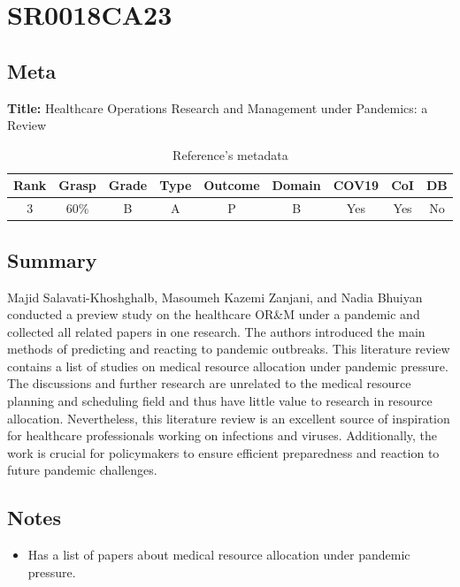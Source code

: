 \section{ SR0018CA23 }


\subsection{Meta}

    \textbf{Title:}
    Healthcare Operations Research and Management under Pandemics: a Review

    \begin{table}[H]
        \centering
        \begin{tabular}{|c|c|c|c|c|c|c|c|c|}
            \hline
                \textbf{Rank} & \textbf{Grasp} & \textbf{Grade} & \textbf{Type} & \textbf{Outcome} & \textbf{Domain} & \textbf{COV19} & \textbf{CoI} & \textbf{DB} \\
            \hline
                3 & 60\% & B & A & P & B & Yes & Yes & No \\
            \hline
        \end{tabular}
        \caption{Reference's metadata}
        \label{tab:SR0018CA23}
    \end{table}

\subsection{Summary}
    Majid Salavati-Khoshghalb, Masoumeh Kazemi Zanjani, and Nadia Bhuiyan \cite{x128} conducted a preview study on the healthcare OR\&M under a pandemic and collected all related papers in one research. The authors introduced the main methods of predicting and reacting to pandemic outbreaks. This literature review contains a list of studies on medical resource allocation under pandemic pressure. The discussions and further research are unrelated to the medical resource planning and scheduling field and thus have little value to research in resource allocation. Nevertheless, this literature review is an excellent source of inspiration for healthcare professionals working on infections and viruses. Additionally, the work is crucial for policymakers to ensure efficient preparedness and reaction to future pandemic challenges.

\subsection{Notes}
    \begin{itemize}
        \item Has a list of papers about medical resource allocation under pandemic pressure.
    \end{itemize}



